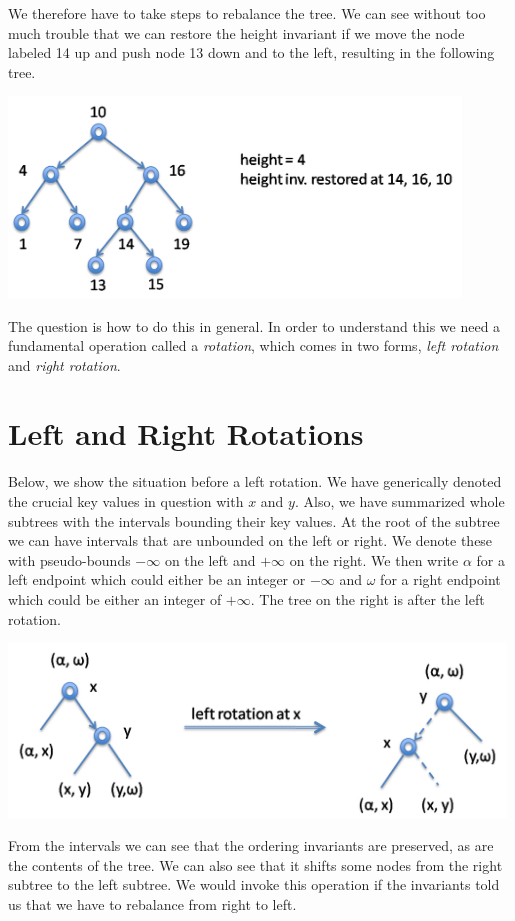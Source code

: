 We therefore have to take steps to rebalance the tree.  We can see without
too much trouble that we can restore the height invariant if we move
the node labeled 14 up and push node 13 down and to the left,
resulting in the following tree.
\begin{center}
  \includegraphics[width=0.9\textwidth]{img/avl4.png}
\end{center}

The question is how to do this in general.  In order to understand
this we need a fundamental operation called a \emph{rotation}, which
comes in two forms, \emph{left rotation} and \emph{right rotation}.

\section{Left and Right Rotations}
\label{sec:avl:rotations}

Below, we show the situation before a left rotation.  We have
generically denoted the crucial key values in question with $x$ and
$y$.  Also, we have summarized whole subtrees with the intervals
bounding their key values.  At the root of the subtree we can have
intervals that are unbounded on the left or right.  We denote these
with pseudo-bounds $-\infty$ on the left and $+\infty$ on the right.
We then write $\alpha$ for a left endpoint which could either be an
integer or $-\infty$ and $\omega$ for a right endpoint which could be
either an integer of $+\infty$.  The tree on the right is after the
left rotation.
\begin{center}
  \includegraphics[width=0.99\textwidth]{img/avl5.png}
\end{center}
From the intervals we can see that the ordering invariants are
preserved, as are the contents of the tree.  We can also see that it
shifts some nodes from the right subtree to the left subtree.  We
would invoke this operation if the invariants told us that we have
to rebalance from right to left.

